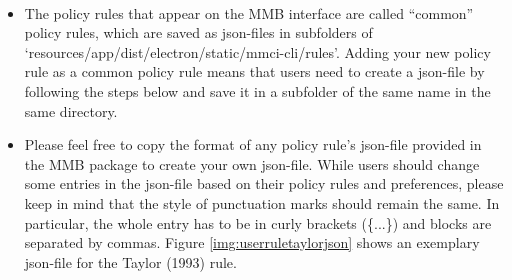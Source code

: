 \\
\begin{itemize}
%
\item The policy rules that appear on the MMB interface are called “common” policy rules, which are saved as json-files in subfolders of `resources/app/dist/electron/static/mmci-cli/rules'. Adding your new policy rule as a common policy rule means that users need to create a json-file by following the steps below and save it in a subfolder of the same name in the same directory.
\item Please feel free to copy the format of any policy rule’s json-file provided in the MMB package to create your own json-file. While users should change some entries in the json-file based on their policy rules and preferences, please keep in mind that the style of punctuation marks should remain the same. 
In particular, the whole entry has to be in curly brackets (\{...\}) and blocks are separated by commas. Figure \ref{img:userruletaylorjson} shows an exemplary json-file for the Taylor (1993) rule.

\end{itemize}
